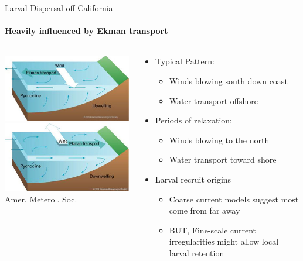 \documentclass[letter,graphicx]{beamer}
\begin{document}
\begin{frame}{Larval Dispersal off California}
\framesubtitle{Heavily influenced by Ekman transport}
\begin{columns}
\begin{column}{0.45\textwidth}
\includegraphics[width=\textwidth]{mhap_figs/ekman-upwelling.jpg}\\
\includegraphics[width=\textwidth]{mhap_figs/ekman-downwelling.jpg}\\
{\tiny Amer. Meterol. Soc.}
\end{column}
\begin{column}{0.55\textwidth}  %
\begin{itemize}
\item Typical Pattern:
\begin{itemize}
\item Winds blowing south down coast
\item Water transport offshore
\end{itemize}
\item Periods of relaxation:
\begin{itemize}
\item Winds blowing to the north
\item Water transport toward shore
\end{itemize}
\item Larval recruit origins
\begin{itemize}
\item Coarse current models suggest most come from far away
\item BUT, Fine-scale current irregularities might allow local
larval retention 
\end{itemize}


\end{itemize}
\end{column}
\end{columns}
\end{frame}
\end{document}
